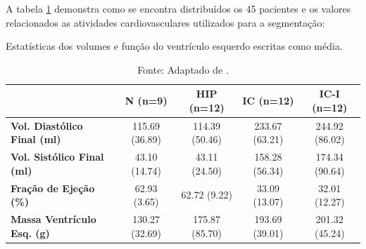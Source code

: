 \noindent A tabela \ref{tab:sunny_stats} demonstra como se encontra distribuídos os 45 pacientes e os valores relacionados as atividades cardiovasculares utilizados para a segmentação:
\newline

\begin{table}[h!]
\centering
\caption{Estatísticas dos volumes e função do ventrículo esquerdo escritas como média.}
\begin{tabular}{@{}lcccc@{}}
\toprule
\textbf{}  & \textbf{N (n=9)} & \textbf{HIP (n=12)} & \textbf{IC (n=12)} & \textbf{IC-I (n=12)} \\ \midrule
\textbf{Vol. Diastólico Final (ml)} & 115.69 (36.89)   & 114.39 (50.46)      & 233.67 (63.21)     & 244.92 (86.02)       \\
\textbf{Vol. Sistólico Final (ml)}  & 43.10 (14.74)    & 43.11 (24.50)       & 158.28 (56.34)     & 174.34 (90.64)       \\
\textbf{Fração de Ejeção (\%)}        & 62.93 (3.65)     & 62.72 (9.22)        & 33.09 (13.07)      & 32.01 (12.27)        \\
\textbf{Massa Ventrículo Esq. (g)} & 130.27 (32.69)   & 175.87 (85.70)      & 193.69 (39.01)     & 201.32 (45.24)       \\ \bottomrule
\end{tabular}
\caption*{Fonte: Adaptado de \cite{radauEvaluationFrameworkAlgorithms2009}.}
\label{tab:sunny_stats}
\end{table}




